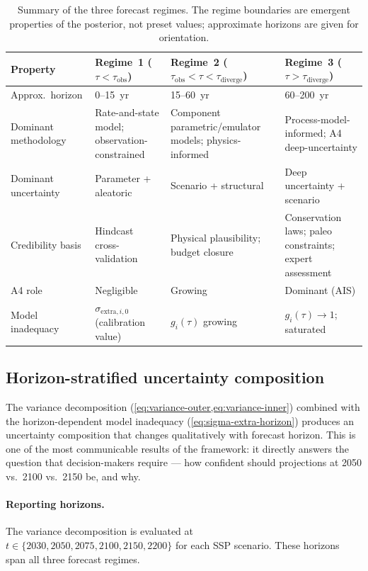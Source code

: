 \documentclass[11pt]{article}
\begin{document}
\begin{table}[ht]
\centering
\caption{Summary of the three forecast regimes.  The regime boundaries are emergent properties of the posterior, not preset values; approximate horizons are given for orientation.}
\label{tab:forecast-regimes}
\small
\begin{tabular}{p{3.2cm}p{3.5cm}p{3.8cm}p{3.5cm}}
\toprule
Property & Regime~1 ($\tau < \tau_{\text{obs}}$) & Regime~2 ($\tau_{\text{obs}} < \tau < \tau_{\text{diverge}}$) & Regime~3 ($\tau > \tau_{\text{diverge}}$) \\
\midrule
Approx.\ horizon & 0--15~yr & 15--60~yr & 60--200~yr \\
\addlinespace
Dominant methodology & Rate-and-state model; observation-constrained & Component parametric/emulator models; physics-informed & Process-model-informed; A4 deep-uncertainty \\
\addlinespace
Dominant uncertainty & Parameter + aleatoric & Scenario + structural & Deep uncertainty + scenario \\
\addlinespace
Credibility basis & Hindcast cross-validation & Physical plausibility; budget closure & Conservation laws; paleo constraints; expert assessment \\
\addlinespace
A4 role & Negligible & Growing & Dominant (AIS) \\
\addlinespace
Model inadequacy & $\sigma_{\text{extra},i,0}$ (calibration value) & $g_i(\tau)$ growing & $g_i(\tau) \to 1$; saturated \\
\bottomrule
\end{tabular}
\end{table}

\subsection{Horizon-stratified uncertainty composition}
\label{sec:horizon-reporting}

The variance decomposition (\cref{eq:variance-outer,eq:variance-inner}) combined with the horizon-dependent model inadequacy (\cref{eq:sigma-extra-horizon}) produces an uncertainty composition that changes qualitatively with forecast horizon.  This is one of the most communicable results of the framework: it directly answers the question that decision-makers require --- how confident should projections at 2050 vs.\ 2100 vs.\ 2150 be, and why.

\paragraph{Reporting horizons.}  The variance decomposition is evaluated at $t \in \{2030, 2050, 2075, 2100, 2150, 2200\}$ for each SSP scenario.  These horizons span all three forecast regimes.
\end{document}
